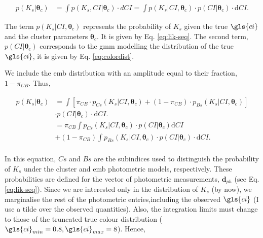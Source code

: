 \begin{align}
p(K_s | \boldsymbol{\theta}_c) & = \int p(K_s,CI | \boldsymbol{\theta}_c) \cdot dCI =  \int p(K_s | CI ,\boldsymbol{\theta}_c) \cdot p(CI|\boldsymbol{\theta}_c)\cdot \mathrm{d}CI. \nonumber
\end{align}

The term $p(K_s | CI ,\boldsymbol{\theta}_c)$ represents the probability of $K_s$ given the true $\gls{ci}$ and the cluster parameters $\boldsymbol{\theta}_c$. It is given by Eq. \ref{eq:lik-seq}. The second term, $p(CI|\boldsymbol{\theta}_c)$ corresponds to the \gls{gmm} modelling the distribution of the true $\gls{ci}$, it is given by Eq. \ref{eq:colordist}. 

We include the \gls{emb}  distribution with an amplitude equal to their fraction, $1-\pi_{CB}$. Thus,

\begin{align}
p(K_s | \boldsymbol{\theta}_c) & =  \int \left[\pi_{CB}\cdot p_{Cs}(K_s| CI, \boldsymbol{\theta}_c) + (1-\pi_{CB})\cdot p_{Bs}(K_s| CI, \boldsymbol{\theta}_c)\right]\nonumber \\& \cdot p(CI|\boldsymbol{\theta}_c)\cdot \mathrm{d}CI. \nonumber \\
& =   \pi_{CB} \int p_{Cs}(K_s| CI, \boldsymbol{\theta}_c) \cdot p(CI|\boldsymbol{\theta}_c) \mathrm{d}CI \nonumber \\
&+ (1-\pi_{CB})\int p_{Bs}(K_s| CI, \boldsymbol{\theta}_c) \cdot p(CI|\boldsymbol{\theta}_c)\cdot  \mathrm{d}CI. \nonumber \\
\end{align}

In this equation, $Cs$ and $Bs$ are the subindices used to distinguish the probability of $K_s$ under the cluster and \gls{emb} photometric models, respectively. These probabilities are defined for the vector of photometric measurements, $\boldsymbol{d}_{ph}$ (see Eq. \ref{eq:lik-seq}). Since we are interested only in the distribution of $K_s$ (by now), we marginalise the rest of the photometric entries,including the observed $\gls{ci}$ (I use a tilde over the observed quantities). Also, the integration limits must change to those of the truncated true colour distribution ($\gls{ci}_{min}=0.8, \gls{ci}_{max}=8$). Hence,


